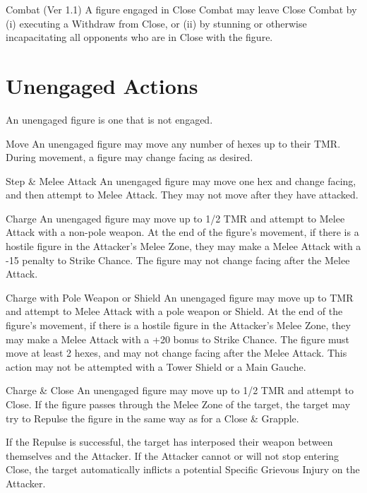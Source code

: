 \begin{Chapter}{Combat (Ver 1.1)}
A figure engaged in Close Combat may leave Close Combat by (i)
executing a Withdraw from Close, or (ii) by stunning or otherwise
incapacitating all opponents who are in Close with the figure.

\section{Unengaged Actions}

An unengaged figure is one that is not engaged. 

\begin{Description}

\item[Move] An unengaged figure may move any number of hexes up to
  their TMR. During movement, a figure may change facing as desired.

\item[Step \& Melee Attack] An unengaged figure may move one hex and
  change facing, and then attempt to Melee Attack.  They may not move
  after they have attacked.

\item[Charge] An unengaged figure may move up to 1/2 TMR and attempt
  to Melee Attack with a non-pole weapon.  At the end of the figure’s
  movement, if there is a hostile figure in the Attacker’s Melee Zone,
  they may make a Melee Attack with a -15 penalty to Strike Chance.
  The figure may not change facing after the Melee Attack.

\item[Charge with Pole Weapon or Shield] An unengaged figure may move
  up to TMR and attempt to Melee Attack with a pole weapon or Shield.
  At the end of the figure’s movement, if there is a hostile figure in
  the Attacker’s Melee Zone, they may make a Melee Attack with a +20
  bonus to Strike Chance.  The figure must move at least 2 hexes, and
  may not change facing after the Melee Attack.  This action may not
  be attempted with a Tower Shield or a Main Gauche.

\item[Charge \& Close] An unengaged figure may move up to 1/2 TMR and
  attempt to Close.  If the figure passes through the Melee Zone of
  the target, the target may try to Repulse the figure in the same way
  as for a Close \& Grapple.

  If the Repulse is successful, the target has interposed their
  weapon between themselves and the Attacker.  If the Attacker cannot
  or will not stop entering Close, the target automatically inflicts a
  potential Specific Grievous Injury on the Attacker.


\end{Description}
\end{Chapter}
